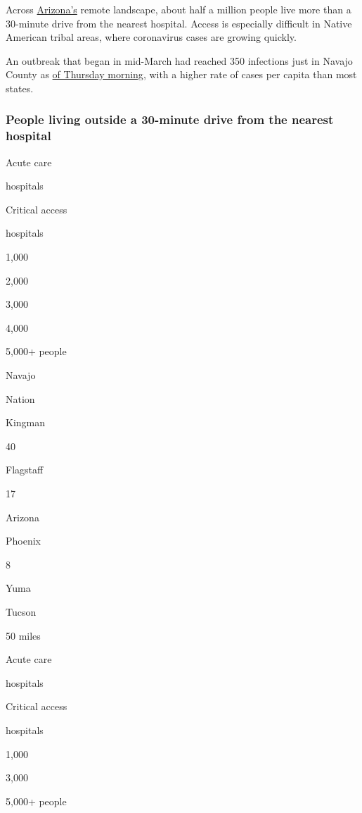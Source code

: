 Across
\href{https://www.nytimes3xbfgragh.onion/interactive/2020/us/arizona-coronavirus-cases.html}{Arizona's}
remote landscape, about half a million people live more than a 30-minute
drive from the nearest hospital. Access is especially difficult in
Native American tribal areas, where coronavirus cases are growing
quickly.

An outbreak that began in mid-March had reached 350 infections just in
Navajo County as
\href{https://www.navajo-nsn.gov/News\%20Releases/OPVP/2020/Apr/FOR\%20IMMEDIATE\%20RELEASE\%20-\%2078\%20new\%20cases\%20and\%20three\%20more\%20deaths\%20related\%20to\%20COVID-19\%20reported.pdf}{of
Thursday morning}, with a higher rate of cases per capita than most
states.

\hypertarget{people-living-outside-a-30-minute-drive-from-the-nearest-hospital-1}{%
\subsubsection{People living outside a 30-minute drive from the nearest
hospital}\label{people-living-outside-a-30-minute-drive-from-the-nearest-hospital-1}}

Acute care

hospitals

Critical access

hospitals

1,000

2,000

3,000

4,000

5,000+ people

Navajo

Nation

Kingman

40

Flagstaff

17

Arizona

Phoenix

8

Yuma

Tucson

50 miles

Acute care

hospitals

Critical access

hospitals

1,000

3,000

5,000+ people

